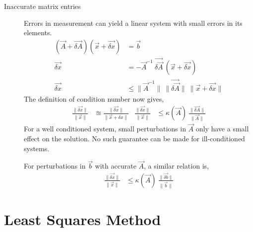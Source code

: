 \begin{description}
    \item[Inaccurate matrix entries] Errors in measurement can yield a linear system with
        small errors in its elements.
        \begin{align}
            (\vec{A} + \vec{\delta A})(\vec{x} + \vec{\delta x}) & = \vec{b}       \\
            \vec{\delta x}                                       & = -\vec{A}^{-1}
            \ \vec{\delta \vec{A}}\ (\vec{x} + \vec{\delta x})                     \\
            \vec{\delta x}                                       & \leq
            \lVert\vec{A}^{-1}\rVert \ \lVert\vec{\delta \vec{A}}\rVert
            \ \lVert \vec{x} + \vec{\delta x} \rVert
        \end{align}
        The definition of condition number now gives,
        \begin{align}
            \frac{\lVert \vec{\delta x} \rVert}{\lVert \vec{x} \rVert}
                                               & \approxeq
            \frac{\lVert \vec{\delta x} \rVert}
            {\lVert \vec{x} + \delta x \rVert} &
            \frac{\lVert \vec{\delta x} \rVert}{\lVert \vec{x} \rVert}
                                               & \leq \kappa(\vec{A})
            \ \frac{\lVert \vec{\delta A} \rVert}{\lVert \vec{A} \rVert}
        \end{align}
        For a well conditioned system, small perturbations in $ \vec{A} $ only have a
        small effect on the solution. No such guarantee can be made for ill-conditioned
        systems. \par
        For perturbations in $ \vec{b} $ with accurate $ \vec{A} $, a similar relation
        is,
        \begin{align}
            \frac{\lVert \vec{\delta x} \rVert}{\lVert \vec{x} \rVert}
             & \leq \kappa(\vec{A})
            \ \frac{\lVert \vec{\delta b} \rVert}{\lVert \vec{b} \rVert}
        \end{align}
\end{description}

\section{Least Squares Method}

